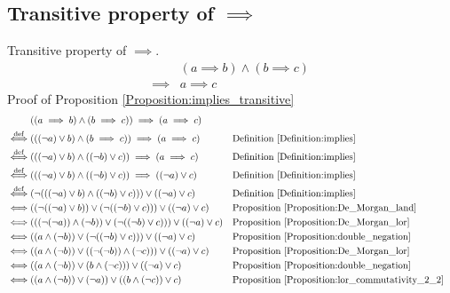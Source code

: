 \subsection{Transitive property of $\implies$}
\begin{prop}
\label{Proposition:implies_transitive}
Transitive property of $\implies$.
\begin{align*}
& (a \implies b) \land (b \implies c) \\
\implies & a \implies c
\end{align*}
Proof of Proposition \ref{Proposition:implies_transitive}
\begin{align*}
& ((a \implies b) \land (b \implies c)) \implies (a \implies c) \\
\overset{\operatorname{def}}{\iff} & (((\lnot a) \lor b) \land (b \implies c)) \implies (a \implies c)
& & \text{Definition \ref{Definition:implies}} \\
\overset{\operatorname{def}}{\iff} & (((\lnot a) \lor b) \land ((\lnot b) \lor c)) \implies (a \implies c)
& & \text{Definition \ref{Definition:implies}} \\
\overset{\operatorname{def}}{\iff} & (((\lnot a) \lor b) \land ((\lnot b) \lor c)) \implies ((\lnot a) \lor c)
& & \text{Definition \ref{Definition:implies}} \\
\overset{\operatorname{def}}{\iff} & (\lnot (((\lnot a) \lor b) \land ((\lnot b) \lor c))) \lor ((\lnot a) \lor c)
& & \text{Definition \ref{Definition:implies}} \\
\iff & ((\lnot ((\lnot a) \lor b)) \lor (\lnot ((\lnot b) \lor c))) \lor ((\lnot a) \lor c)
& & \text{Proposition \ref{Proposition:De_Morgan_land}} \\
\iff & (((\lnot (\lnot a)) \land (\lnot b)) \lor (\lnot ((\lnot b) \lor c))) \lor ((\lnot a) \lor c)
& & \text{Proposition \ref{Proposition:De_Morgan_lor}} \\
\iff & ((a \land (\lnot b)) \lor (\lnot ((\lnot b) \lor c))) \lor ((\lnot a) \lor c)
& & \text{Proposition \ref{Proposition:double_negation}} \\
\iff & ((a \land (\lnot b)) \lor ((\lnot (\lnot b)) \land (\lnot c))) \lor ((\lnot a) \lor c)
& & \text{Proposition \ref{Proposition:De_Morgan_lor}} \\
\iff & ((a \land (\lnot b)) \lor (b \land (\lnot c))) \lor ((\lnot a) \lor c)
& & \text{Proposition \ref{Proposition:double_negation}} \\
\iff & ((a \land (\lnot b)) \lor (\lnot a)) \lor ((b \land (\lnot c)) \lor c)
& & \text{Proposition \ref{Proposition:lor_commutativity_2_2}} \\

\end{align*}
\end{prop}
